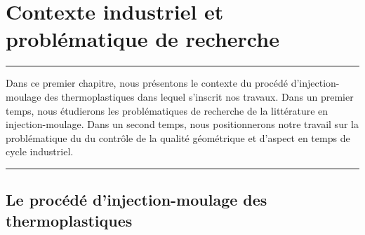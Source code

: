 
\lhead[\fancyplain{}{\leftmark}]%
      {\fancyplain{}{}} %
\chead[\fancyplain{}{}]%
      {\fancyplain{}{}}
\rhead[\fancyplain{}{}]%
      {\fancyplain{}{\rightmark}}%
\lfoot[\fancyplain{}{}]%
      {\fancyplain{}{}}
\cfoot[\fancyplain{}{\thepage}]%
      {\fancyplain{}{\thepage}} %
\rfoot[\fancyplain{}{}]%
     {\fancyplain{}{\scriptsize}}



\chapter{Contexte industriel et problématique de recherche}
\label{ch:objectives}


\begin{center}
\rule{0.7\linewidth}{.5pt}
\begin{minipage}{0.7\linewidth}
\smallskip

Dans ce premier chapitre, nous présentons le contexte du procédé d'injection-moulage des thermoplastiques dans lequel s'inscrit nos travaux.
Dans un premier temps, nous étudierons les problématiques de recherche de la littérature en injection-moulage.
Dans un second temps, nous positionnerons notre travail sur la problématique du  du contrôle de la qualité géométrique et d'aspect en temps de cycle industriel.

\end{minipage}
\smallskip
\rule{0.7\linewidth}{.5pt}
\end{center}

\minitoc
\newpage

\section{Le procédé d'injection-moulage des thermoplastiques}  \label{sec:molding_presentation}

